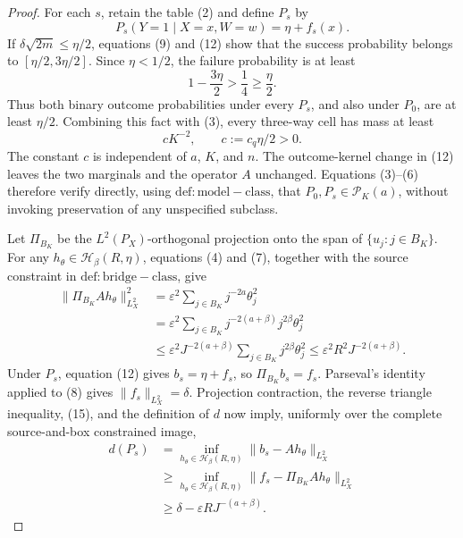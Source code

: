 \documentclass{article}
\begin{document}
\begin{proof}
For each \(s\), retain the table (2) and define \(P_s\) by
\[
 P_s(Y=1\mid X=x,W=w)=\eta+f_s(x).
 \tag{12}
\]
If \(\delta\sqrt{2m}\leq\eta/2\), equations (9) and (12) show that the success probability belongs to \([\eta/2,3\eta/2]\).  Since \(\eta<1/2\), the failure probability is at least
\[
 1-\frac{3\eta}{2}>\frac14\geq\frac\eta2.
 \tag{13}
\]
Thus both binary outcome probabilities under every \(P_s\), and also under \(P_0\), are at least \(\eta/2\).  Combining this fact with (3), every three-way cell has mass at least
\[
 cK^{-2},
 \qquad
 c:=c_q\eta/2>0.
 \tag{14}
\]
The constant \(c\) is independent of \(a\), \(K\), and \(n\).  The outcome-kernel change in (12) leaves the two marginals and the operator \(A\) unchanged.  Equations (3)--(6) therefore verify directly, using \(\mathrm{def:model-class}\), that \(P_0,P_s\in\mathcal P_K(a)\), without invoking preservation of any unspecified subclass.

Let \(\Pi_{B_K}\) be the \(L^2(P_X)\)-orthogonal projection onto the span of \(\{u_j:j\in B_K\}\).  For any \(h_\theta\in\mathcal H_\beta(R,\eta)\), equations (4) and (7), together with the source constraint in \(\mathrm{def:bridge-class}\), give
\[
 \begin{aligned}
 \|\Pi_{B_K}Ah_\theta\|_{L^2_X}^2
 &=\varepsilon^2\sum_{j\in B_K}j^{-2a}\theta_j^2 \\
 &=\varepsilon^2\sum_{j\in B_K}j^{-2(a+\beta)}j^{2\beta}\theta_j^2 \\
 &\leq\varepsilon^2J^{-2(a+\beta)}
       \sum_{j\in B_K}j^{2\beta}\theta_j^2
 \leq\varepsilon^2R^2J^{-2(a+\beta)}.
 \end{aligned}
 \tag{15}
\]
Under \(P_s\), equation (12) gives \(b_s=\eta+f_s\), so \(\Pi_{B_K}b_s=f_s\).  Parseval's identity applied to (8) gives \(\|f_s\|_{L^2_X}=\delta\).  Projection contraction, the reverse triangle inequality, (15), and the definition of \(d\) now imply, uniformly over the complete source-and-box constrained image,
\[
 \begin{aligned}
 d(P_s)
 &=\inf_{h_\theta\in\mathcal H_\beta(R,\eta)}
     \|b_s-Ah_\theta\|_{L^2_X} \\
 &\geq\inf_{h_\theta\in\mathcal H_\beta(R,\eta)}
     \|f_s-\Pi_{B_K}Ah_\theta\|_{L^2_X} \\
 &\geq\delta-\varepsilon RJ^{-(a+\beta)}.
 \end{aligned}
 \tag{16}
\]


\end{proof}
\end{document}
